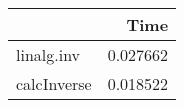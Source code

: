 \begin{tabular}{lr}
\toprule
{} &      Time \\
\midrule
linalg.inv  &  0.027662 \\
calcInverse &  0.018522 \\
\bottomrule
\end{tabular}
